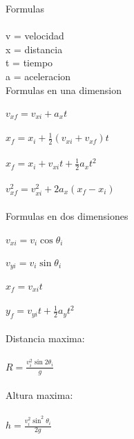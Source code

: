 \documentclass{article}
\begin{document}
    \large
    Formulas \\ \\
    v = velocidad \\
    x = distancia \\
    t = tiempo \\
    a = aceleracion \\
    Formulas en una dimension \\ \\
    $v_{xf} = v_{xi} + a_x t$ \\ \\
    $x_f = x_i + \frac{1}{2} (v_{xi} + v_{xf})t$ \\ \\
    $x_f = x_i + v_{xi}t + \frac{1}{2} a_xt^{2}$ \\ \\
    $v_{xf}^2 = v_{xi}^2+2a_x(x_f-x_i)$ \\ \\
    Formulas en dos dimensiones \\ \\
    $v_{xi} = v_i\cos \theta _i$ \\ \\
    $v_{yi} = v_i\sin \theta _i$ \\ \\
    $x_f = v_{xi}t$ \\ \\
    $y_f = v_{yi}t + \frac{1}{2}a_y t^2$ \\ \\
    Distancia maxima: \\ \\ 
    $R = \frac{v_i^2\sin 2\theta _i}{g}$ \\ \\
    Altura maxima: \\ \\
    $h = \frac{v_i ^2 \sin ^2\theta _i}{2g}$
\end{document}
